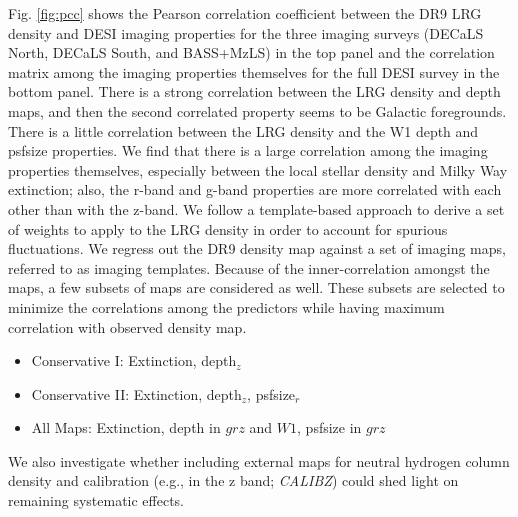 Fig. \ref{fig:pcc} shows the Pearson correlation coefficient between the DR9 LRG density and DESI imaging properties for the three imaging surveys (DECaLS North, DECaLS South, and BASS+MzLS) in the top panel and the correlation matrix among the imaging properties themselves for the full DESI survey in the bottom panel. There is a strong correlation between the LRG density and depth maps, and then the second correlated property seems to be Galactic foregrounds. There is a little correlation between the LRG density and the W1 depth and psfsize properties. We find that there is a large correlation among the imaging properties themselves, especially between the local stellar density and Milky Way extinction; also, the r-band and g-band properties are more correlated with each other than with the z-band. We follow a template-based approach to derive a set of weights to apply to the LRG density in order to account for spurious fluctuations. We regress out the DR9 density map against a set of imaging maps, referred to as imaging templates.  Because of the inner-correlation amongst the maps, a few subsets of maps are considered as well. These subsets are selected to minimize the correlations among the predictors while having maximum correlation with observed density map.
\begin{itemize}
\item Conservative I: Extinction, depth$_{z}$
\item Conservative II: Extinction, depth$_{z}$, psfsize$_{r}$
\item All Maps: Extinction, depth in $grz$ and $W1$, psfsize in $grz$
\end{itemize}
We also investigate whether including external maps for neutral hydrogen column density  and calibration (e.g., in the z band; \textit{CALIBZ}) could shed light on remaining systematic effects. 

